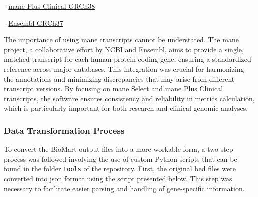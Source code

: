 - \href{http://www.ensembl.org/biomart/martview/a07a268477bc2307cce8fde9f6a88a1b?VIRTUALSCHEMANAME=default&ATTRIBUTES=hsapiens_gene_ensembl.default.structure.chromosome_name|hsapiens_gene_ensembl.default.structure.exon_chrom_start|hsapiens_gene_ensembl.default.structure.exon_chrom_end|hsapiens_gene_ensembl.default.structure.ensembl_gene_id_version|hsapiens_gene_ensembl.default.structure.external_gene_name|hsapiens_gene_ensembl.default.structure.ensembl_exon_id|hsapiens_gene_ensembl.default.structure.strand|hsapiens_gene_ensembl.default.structure.ensembl_transcript_id_version&FILTERS=hsapiens_gene_ensembl.default.filters.mane_plus_clinical.only&VISIBLEPANEL=filterpanel}{\ac{mane} Plus Clinical GRCh38}

- \href{http://grch37.ensembl.org/biomart/martview/a77a9f701d17019853f36da352517c7d?VIRTUALSCHEMANAME=default&ATTRIBUTES=hsapiens_gene_ensembl.default.structure.chromosome_name|hsapiens_gene_ensembl.default.structure.exon_chrom_start|hsapiens_gene_ensembl.default.structure.exon_chrom_end|hsapiens_gene_ensembl.default.structure.ensembl_gene_id_version|hsapiens_gene_ensembl.default.structure.external_gene_name|hsapiens_gene_ensembl.default.structure.ensembl_exon_id|hsapiens_gene_ensembl.default.structure.strand|hsapiens_gene_ensembl.default.structure.ensembl_transcript_id_version&FILTERS=&VISIBLEPANEL=attributepanel}{Ensembl GRCh37}

The importance of using \ac{mane} transcripts cannot be understated. The \ac{mane} project, a collaborative effort by NCBI and Ensembl, aims to provide a single, matched transcript for each human protein-coding gene, ensuring a standardized reference across major databases. This integration was crucial for harmonizing the annotations and minimizing discrepancies that may arise from different transcript versions. By focusing on \ac{mane} Select and \ac{mane} Plus Clinical transcripts, the software ensures consistency and reliability in metrics calculation, which is particularly important for both research and clinical genomic analyses.

\subsubsection{\textbf{Data Transformation Process}}

To convert the BioMart output files into a more workable form, a two-step process was followed involving the use of custom Python scripts that can be found in the folder \texttt{tools} of the repository. First, the original \ac{bed} files were converted into \ac{json} format using the script presented below. This step was necessary to facilitate easier parsing and handling of gene-specific information.

